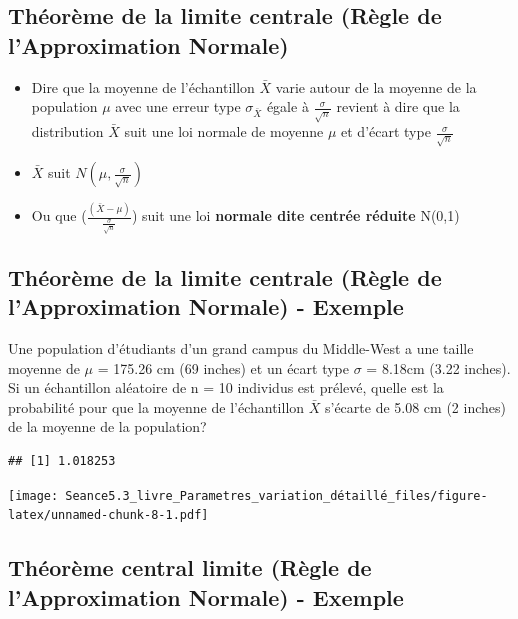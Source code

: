 \documentclass[
]{article}
\begin{document}
\hypertarget{thuxe9oruxe8me-de-la-limite-centrale-ruxe8gle-de-lapproximation-normale}{%
\subsection{Théorème de la limite centrale (Règle de l'Approximation
Normale)}\label{thuxe9oruxe8me-de-la-limite-centrale-ruxe8gle-de-lapproximation-normale}}

\begin{itemize}
\item
  Dire que la moyenne de l'échantillon \(\bar{X}\) varie autour de la
  moyenne de la population \(\mu\) avec une erreur type
  \(\sigma_{\bar{X}}\) égale à \(\frac{\sigma}{\sqrt{n}}\) revient à
  dire que la distribution \(\bar{X}\) suit une loi normale de moyenne
  \(\mu\) et d'écart type \(\frac{\sigma}{\sqrt{n}}\)
\item
  \(\bar{X}\) suit \(N(\mu, \frac{\sigma}{\sqrt{n}})\)
\item
  Ou que (\(\frac{(\bar{X}-\mu)}{\frac{\sigma}{\sqrt{n}}}\)) suit une
  loi \textbf{normale dite centrée réduite} N(0,1)
\end{itemize}

\hypertarget{thuxe9oruxe8me-de-la-limite-centrale-ruxe8gle-de-lapproximation-normale---exemple}{%
\subsection{Théorème de la limite centrale (Règle de l'Approximation
Normale) -
Exemple}\label{thuxe9oruxe8me-de-la-limite-centrale-ruxe8gle-de-lapproximation-normale---exemple}}

Une population d'étudiants d'un grand campus du Middle-West a une taille
moyenne de \(\mu\) = 175.26 cm (69 inches) et un écart type \(\sigma\) =
8.18cm (3.22 inches). Si un échantillon aléatoire de n = 10 individus
est prélevé, quelle est la probabilité pour que la moyenne de
l'échantillon \(\bar{X}\) s'écarte de 5.08 cm (2 inches) de la moyenne
de la population?

\begin{verbatim}
## [1] 1.018253
\end{verbatim}

\texttt{[image: Seance5.3\_livre\_Parametres\_variation\_détaillé\_files/figure-latex/unnamed-chunk-8-1.pdf]}

\hypertarget{thuxe9oruxe8me-central-limite-ruxe8gle-de-lapproximation-normale---exemple}{%
\subsection{Théorème central limite (Règle de l'Approximation Normale) -
Exemple}\label{thuxe9oruxe8me-central-limite-ruxe8gle-de-lapproximation-normale---exemple}}
\end{document}
